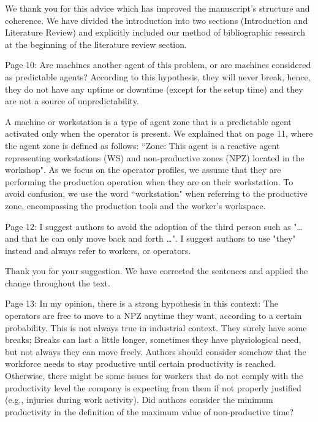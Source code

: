 \documentclass[preprint,11pt,3p]{elsarticle}
\begin{document}
\begin{tcolorbox}[colback=r_color1, colframe=r_color2, title=R1:]
We thank you for this advice which has improved the manuscript's structure and coherence. We have divided the introduction into two sections (Introduction and Literature Review) and explicitly included our method of bibliographic research at the beginning of the literature review section.   
 \end{tcolorbox}
\begin{tcolorbox}[colback=q_color1, colframe=q_color2,title=Q2:] Page 10: Are machines another agent of this problem, or are machines considered as predictable agents? According to this hypothesis, they will never break, hence, they do not have any uptime or downtime (except for the setup time) and they are not a source of unpredictability.
\end{tcolorbox}

\begin{tcolorbox}[colback=r_color1,colframe=r_color2,title=R2:]
A machine or workstation is a type of agent zone that is a predictable agent activated only when the operator is present. We explained that on page 11, where the agent zone is defined as follows: ``Zone: This agent is a reactive agent representing workstations (WS) and non-productive zones (NPZ) located in the workshop". As we focus on the operator profiles, we assume that they are performing the production operation when they are on their workstation. To avoid confusion, we use the word ``workstation" when referring to the productive zone, encompassing the production tools and the worker's workspace. 
\end{tcolorbox}

\begin{tcolorbox}[colback=q_color1,colframe=q_color2,title=Q3:] Page 12: I suggest authors to avoid the adoption of the third person such as "… and that he can only move back and forth …". I suggest authors to use "they" instead and always refer to workers, or operators.
\end{tcolorbox}

\begin{tcolorbox}[colback=r_color1,colframe=r_color2,title=R3:]
Thank you for your suggestion. We have corrected the sentences and applied the change throughout the text.
\end{tcolorbox}
\begin{tcolorbox}[colback=q_color1,colframe=q_color2,title=Q4:] Page 13: In my opinion, there is a strong hypothesis in this context: The operators are free to move to a NPZ anytime they want, according to a certain probability. This is not always true in industrial context. They surely have some breaks; Breaks can last a little longer, sometimes they have physiological need, but not always they can move freely. Authors should consider somehow that the workforce needs to stay productive until certain productivity is reached. Otherwise, there might be some issues for workers that do not comply with the productivity level the company is expecting from them if not properly justified (e.g., injuries during work activity). Did authors consider the minimum productivity in the definition of the maximum value of non-productive time?
\end{tcolorbox}
\end{document}
